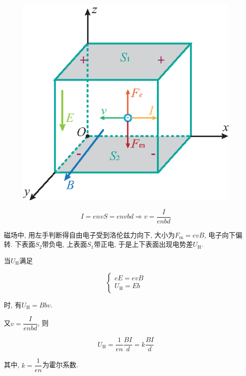 \begin{figure}[H]
	\centering
	\includegraphics[scale=1.0]{C8-fig12.eps}
\end{figure}

\begin{equation}
	I = envS = envbd \Rightarrow v = \dfrac{I}{enbd} \label{C8-eq11}
\end{equation}

磁场中, 用左手判断得自由电子受到洛伦兹力向下, 大小为$F_{\textrm{m}} = evB$, 电子向下偏转. 下表面$S_2$带负电, 上表面$S_1$带正电, 于是上下表面出现电势差$U_{\textrm{H}}$.

当$U_{\textrm{H}}$满足

\begin{equation*}
	\begin{cases}
		eE = evB \\
		U_{\textrm{H}} = Eb
	\end{cases}
\end{equation*}

时, 有$U_{\textrm{H}} = Bbv$.

\vskip 0.3cm

又$v = \dfrac{I}{enbd}$, 则

\begin{equation}
	U_{\textrm{H}} = \dfrac{1}{en} \dfrac{BI}{d} = k\dfrac{BI}{d} \label{C8-eq12}
\end{equation}

其中, $k = \dfrac{1}{en}$为霍尔系数. 

\vskip 0.3cm

